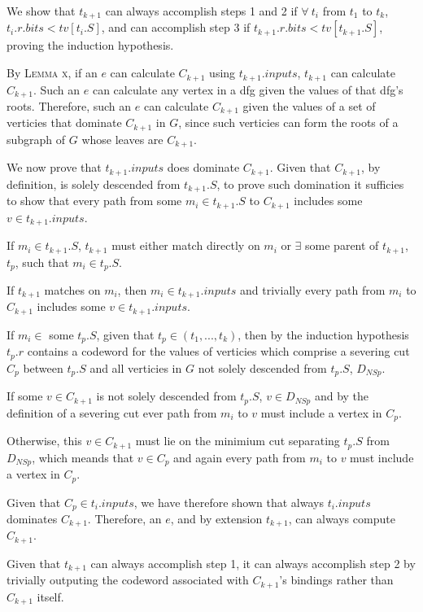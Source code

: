 We show that $t_{k+1}$ can always accomplish steps 1 and 2 if $\forall\ t_i$ from $t_1$ to $t_k$, $t_i.r.bits < tv[t_i.S]$, and can accomplish step 3 if $t_{k+1}.r.bits < tv[t_{k+1}.S]$, proving the induction hypothesis.


By \textsc{Lemma x}, if an $e$ can calculate $C_{k+1}$ using $t_{k+1}.inputs$, $t_{k+1}$ can calculate $C_{k+1}$. Such an $e$ can calculate any vertex in a dfg given the values of that dfg's roots. Therefore, such an $e$ can calculate $C_{k+1}$  given the values of a set of verticies that dominate $C_{k+1}$ in $G$, since such verticies can form the roots of a subgraph of $G$ whose leaves are $C_{k+1}$.

We now prove that $t_{k+1}.inputs$ does dominate $C_{k+1}$. Given that $C_{k+1}$, by definition, is solely descended from $t_{k+1}.S$, to prove such domination it sufficies to show that every path from some $m_i \in t_{k+1}.S$ to $C_{k+1}$ includes some $v \in t_{k+1}.inputs$.

If $m_i \in t_{k+1}.S$, $t_{k+1}$ must either match directly on $m_i$ or $\exists$ some parent of $t_{k+1}$, $t_p$, such that $m_i \in t_p.S$.

If $t_{k+1}$ matches on $m_i$, then $m_i \in t_{k+1}.inputs$ and trivially every path from $m_i$ to $C_{k+1}$ includes some $v \in t_{k+1}.inputs$.


If $m_i \in$ some $t_p.S$, given that $t_p \in (t_1, ..., t_k)$, then by the induction hypothesis $t_p.r$ contains a codeword for the values of verticies which comprise a severing cut $C_p$ between $t_p.S$ and  all verticies in $G$ not solely descended from $t_p.S$, $D_{NSp}$.

If some $v \in C_{k+1}$ is not solely descended from $t_p.S$, $v \in D_{NSp}$ and by the definition of a severing cut ever path from $m_i$ to $v$ must include a vertex in $C_p$.

Otherwise, this $v \in C_{k+1}$ must lie on the minimium cut separating $t_p.S$ from $D_{NSp}$, which meands that $v \in C_p$ and again every path from $m_i$ to $v$ must include a vertex in $C_p$.

Given that $C_p \in t_i.inputs$, we have therefore shown that always $t_i.inputs$ dominates $C_{k+1}$. Therefore, an $e$, and by extension $t_{k+1}$, can always compute $C_{k+1}$.

Given that $t_{k+1}$ can always accomplish step 1, it can always accomplish step 2 by trivially outputing the codeword associated with $C_{k+1}$'s bindings rather than $C_{k+1}$ itself.

